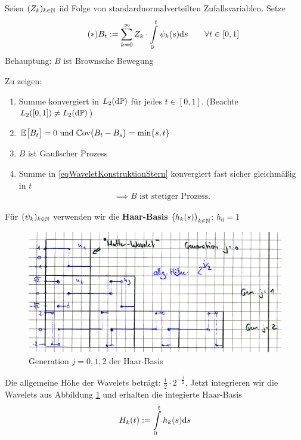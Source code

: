 \begin{theorem}\label{theorem10.2}
	Seien $(Z_k)_{k\in\mathbb{N}}$ iid Folge von standardnormalverteilten Zufallsvariablen. Setze
	\begin{align}\label{eqWaveletKonstruktionStern}\tag{$\ast$}
		B_t:=\sum\limits_{k=0}^\infty Z_k\cdot\int\limits_0^t\psi_k(s)\mathrm{d} s\qquad\forall t\in[0,1]
	\end{align}
	Behauptung: $B$ ist Brownsche Bewegung
\end{theorem}

Zu zeigen:
\begin{enumerate}[label=\alph*)]
	\item Summe konvergiert in $L_2(\mathrm{d}\mathbb{P})$ für jedes $t\in[0,1]$. (Beachte $L_2([0,1])\neq L_2(\mathrm{d}\mathbb{P})$)
	\item $\begin{aligned}
		\mathbb{E}\big[B_t\big]=0\text{ und }\mathbb{C}\text{ov}\big(B_t-B_s\big)=\min\lbrace s,t\rbrace
	\end{aligned}$
	\item $B$ ist Gaußscher Prozess
	\item Summe in \eqref{eqWaveletKonstruktionStern} konvergiert fast sicher gleichmäßig in $t$
	\begin{align*}
		\implies B\text{ ist stetiger Prozess.}
	\end{align*}
\end{enumerate}

Für $(\psi_k)_{k\in\mathbb{N}}$ verwenden wir die \textbf{Haar-Basis} $\big(h_k(s)\big)_{k\in\mathbb{N}}$: $h_0 = 1$

\begin{figure}[H]
	\begin{center}
		\includegraphics[width=1\textwidth]{./pics/WTHMscan001.png}
		\caption{Generation $j=0,1,2$ der Haar-Basis}
		\label{AbbHaarBasis}
	\end{center}
\end{figure}
Die allgemeine Höhe der Wavelets beträgt: $\frac{1}{2}\cdot2^{-\frac{j}{2}}$.
Jetzt integrieren wir die Wavelets aus Abbildung \ref{AbbHaarBasis} und erhalten die integierte Haar-Basis
\begin{align*}
	H_k(t):=\int\limits_0^t h_k(s)\mathrm{d} s
\end{align*}

